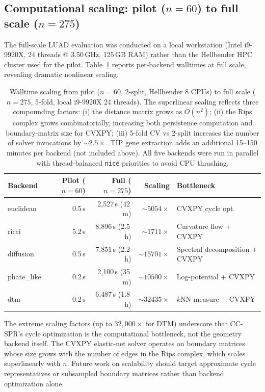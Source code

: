 \documentclass[11pt]{article}
\begin{document}
\subsection{Computational scaling: pilot ($n = 60$) to full scale ($n = 275$)}

The full-scale LUAD evaluation was conducted on a local workstation (Intel i9-9920X, 24 threads @ 3.50\,GHz, 125\,GB RAM) rather than the Hellbender HPC cluster used for the pilot.
Table~\ref{tab:fullscale_timing} reports per-backend walltimes at full scale, revealing dramatic nonlinear scaling.

\begin{table}[h]
\centering\small
\begin{tabular}{lrrrl}
\toprule
Backend & Pilot ($n=60$) & Full ($n=275$) & Scaling & Bottleneck \\
\midrule
euclidean & 0.5\,s & 2,527\,s (42\,m) & ${\sim}5054\times$ & CVXPY cycle opt. \\
ricci & 5.2\,s & 8,896\,s (2.5\,h) & ${\sim}1711\times$ & Curvature flow + CVXPY \\
diffusion & 0.5\,s & 7,851\,s (2.2\,h) & ${\sim}15701\times$ & Spectral decomposition + CVXPY \\
phate\_like & 0.2\,s & 2,100\,s (35\,m) & ${\sim}10500\times$ & Log-potential + CVXPY \\
dtm & 0.2\,s & 6,487\,s (1.8\,h) & ${\sim}32435\times$ & $k$NN measure + CVXPY \\
\bottomrule
\end{tabular}
\caption{Walltime scaling from pilot ($n = 60$, 2-split, Hellbender 8 CPUs) to full scale ($n = 275$, 5-fold, local i9-9920X 24 threads).
The superlinear scaling reflects three compounding factors: (i) the distance matrix grows as $O(n^2)$; (ii) the Rips complex grows combinatorially, increasing both persistence computation and boundary-matrix size for CVXPY; (iii) 5-fold CV vs 2-split increases the number of solver invocations by ${\sim}2.5\times$.
TIP gene extraction adds an additional 15--150 minutes per backend (not included above).
All five backends were run in parallel with thread-balanced \texttt{nice} priorities to avoid CPU thrashing.}
\label{tab:fullscale_timing}
\end{table}

The extreme scaling factors (up to $32{,}000\times$ for DTM) underscore that CC-SPR's cycle optimization is the computational bottleneck, not the geometry backend itself.
The CVXPY elastic-net solver operates on boundary matrices whose size grows with the number of edges in the Rips complex, which scales superlinearly with $n$.
Future work on scalability should target approximate cycle representatives or subsampled boundary matrices rather than backend optimization alone.
\end{document}
